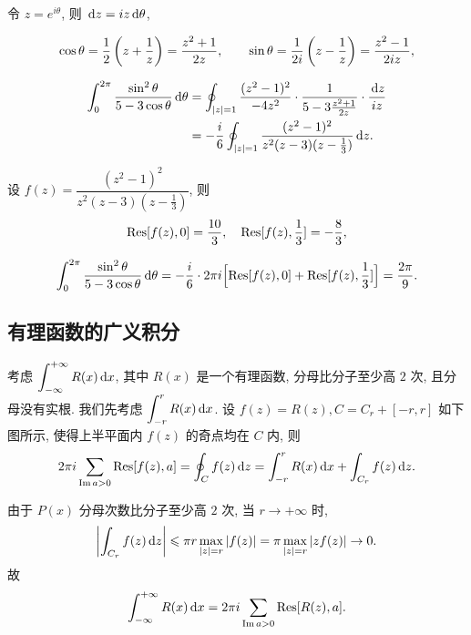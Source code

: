 \begin{solution}
	令 $z=e^{i\theta}$, 则 $\,\mathrm{d} z=iz\,\mathrm{d}\theta$,
	{
		\[\cos\theta=\frac{1}{2}\left(z+\frac1z\right)=\frac{z^2+1}{2z},\qquad
		\sin\theta=\frac1{2i}\left(z-\frac1z\right)=\frac{z^2-1}{2iz},\]

		\begin{align*}
			\int_0^{2\pi}\frac{\sin^2\theta}{5-3\cos\theta}\,\mathrm{d}\theta
			&=\oint_{|z|=1}\frac{(z^2-1)^2}{-4z^2}\cdot\frac1{5-3\frac{z^2+1}{2z}}\cdot\frac{\,\mathrm{d} z}{iz}\\
			&=-\frac i6\oint_{|z|=1}\frac{(z^2-1)^2}{z^2(z-3)(z-\frac13)}\,\mathrm{d} z.
		\end{align*}
	}
	设 $f(z)=\dfrac{(z^2-1)^2}{z^2(z-3)(z-\frac13)}$,
	{则
		\[{\mathrm{Res}}[f(z),0]=\frac{10}3,\quad{\mathrm{Res}}[f(z),\frac13]=-\frac83,\]
	}

	{
		\[
			\int_0^{2\pi}\frac{\sin^2\theta}{5-3\cos\theta}\,\mathrm{d}\theta
			=-\frac i6\cdot 2\pi i\Bigl[{\mathrm{Res}}[f(z),0]+{\mathrm{Res}}[f(z),\frac13]\Bigr]
			=\frac{2\pi}9.
		\]
	}
\end{solution}

\subsection{有理函数的广义积分}

考虑 $\displaystyle\int_{-\infty}^{+\infty}R(x)\,\mathrm{d} x$, 其中 $R(x)$ 是一个有理函数, 分母比分子至少高 $2$ 次, 且分母没有实根.
我们先考虑 $\displaystyle\int_{-r}^rR(x)\,\mathrm{d} x$.
设 $f(z)=R(z),C=C_r+[-r,r]$ 如下图所示, 使得上半平面内 $f(z)$ 的奇点均在 $C$ 内,
则
\[2\pi i\sum_{\operatorname{Im} a>0}{\mathrm{Res}}[f(z),a]=\oint_Cf(z)\,\mathrm{d} z=\int_{-r}^rR(x)\,\mathrm{d} x+\int_{C_r}f(z)\,\mathrm{d} z.\]

\begin{center}
\end{center}

由于 $P(x)$ 分母次数比分子至少高 $2$ 次,
当 $r\to+\infty$ 时,
\[\left|\int_{C_r}f(z)\,\mathrm{d} z\right|\leqslant \pi r\max_{|z|=r}|f(z)|
=\pi \max_{|z|=r}|zf(z)|\to 0.\]
故
	\[\int_{-\infty}^{+\infty}R(x)\,\mathrm{d} x=2\pi i\sum_{\operatorname{Im} a>0}{\mathrm{Res}}[R(z),a].\]

